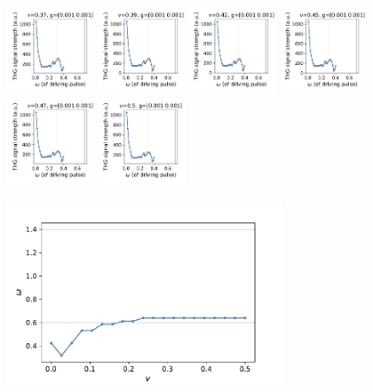 \documentclass[a4paper]{article}
\begin{document}
\begin{figure}[H]
  \includegraphics[width=0.23\textwidth]{leggett-driving3-v14-case0.pdf}
  \includegraphics[width=0.23\textwidth]{leggett-driving3-v15-case0.pdf}
  \includegraphics[width=0.23\textwidth]{leggett-driving3-v16-case0.pdf}
  \includegraphics[width=0.23\textwidth]{leggett-driving3-v17-case0.pdf}
  \includegraphics[width=0.23\textwidth]{leggett-driving3-v18-case0.pdf}
  \includegraphics[width=0.23\textwidth]{leggett-driving3-v19-case0.pdf}
\end{figure}
\begin{figure}[H]
  \centering
  \includegraphics[width=0.73\textwidth]{leggett-driving3-legget-energy.pdf}
\end{figure}
\end{document}
